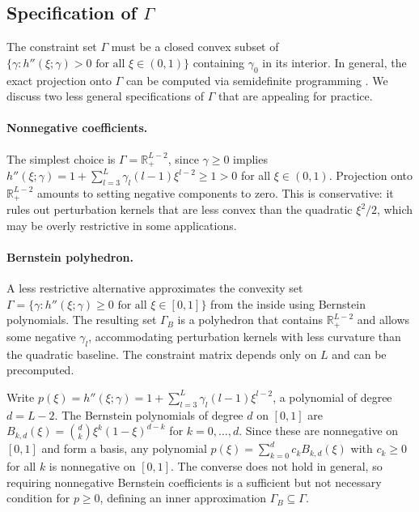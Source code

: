 \documentclass[12pt]{article}
\begin{document}
\subsection{Specification of $\Gamma$}

The constraint set $\Gamma$ must be a closed convex subset of $\{\gamma : h''(\xi; \gamma) > 0 \text{ for all } \xi \in (0,1)\}$ containing $\gamma_0$ in its interior. In general, the exact projection onto $\Gamma$ can be computed via semidefinite programming \citep{powers_algorithm_1998}. We discuss two less general specifications of $\Gamma$ that are appealing for practice. 

\paragraph{Nonnegative coefficients.} The simplest choice is $\Gamma = \mathbb{R}_+^{L-2}$, since $\gamma \geq 0$ implies $h''(\xi; \gamma) = 1 + \sum_{l=3}^{L} \gamma_l (l-1) \xi^{l-2} \geq 1 > 0$ for all $\xi \in (0,1)$. Projection onto $\mathbb{R}_+^{L-2}$ amounts to setting negative components to zero. This is conservative: it rules out perturbation kernels that are less convex than the quadratic $\xi^2/2$, which may be overly restrictive in some applications.

\paragraph{Bernstein polyhedron.} A less restrictive alternative approximates the convexity set $\Gamma = \{\gamma : h''(\xi; \gamma) \geq 0 \text{ for all } \xi \in [0,1]\}$ from the inside using Bernstein polynomials. The resulting set $\Gamma_B$ is a polyhedron that contains $\mathbb{R}_+^{L-2}$ and allows some negative $\gamma_l$, accommodating perturbation kernels with less curvature than the quadratic baseline. The constraint matrix depends only on $L$ and can be precomputed.

Write $p(\xi) = h''(\xi; \gamma) = 1 + \sum_{l=3}^{L} \gamma_l (l-1) \xi^{l-2}$, a polynomial of degree $d = L-2$. The Bernstein polynomials of degree $d$ on $[0,1]$ are $B_{k,d}(\xi) = \binom{d}{k} \xi^k (1-\xi)^{d-k}$ for $k = 0, \ldots, d$. Since these are nonnegative on $[0,1]$ and form a basis, any polynomial $p(\xi) = \sum_{k=0}^{d} c_k B_{k,d}(\xi)$ with $c_k \geq 0$ for all $k$ is nonnegative on $[0,1]$. The converse does not hold in general, so requiring nonnegative Bernstein coefficients is a sufficient but not necessary condition for $p \geq 0$, defining an inner approximation $\Gamma_B \subseteq \Gamma$.
\end{document}
